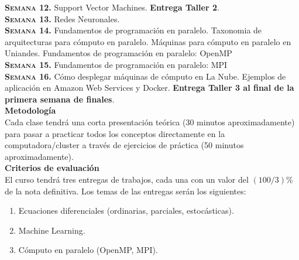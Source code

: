 \documentclass[letterpaper,10pt,onecolumn]{article}
\begin{document}
\noindent\textbf{\textsc{Semana 12.}}  
Support Vector Machines.
{\bf Entrega Taller 2}.
\\[-0.3cm]  

\noindent\textbf{\textsc{Semana 13.}} 
Redes Neuronales. 
\\[-0.3cm]  

\noindent\textbf{\textsc{Semana 14.}} 
Fundamentos de programaci\'on en paralelo. Taxonomia de arquitecturas
para c\'omputo en paralelo. M\'aquinas para c\'omputo en paralelo en
Uniandes. 
Fundamentos de programaci\'on en paralelo: OpenMP
\\[-0.3cm] 

\noindent\textbf{\textsc{Semana 15.}} 
Fundamentos de programaci\'on en paralelo: MPI
\\[-0.3cm] 

\noindent\textbf{\textsc{Semana 16.}} 
C\'omo desplegar m\'aquinas de c\'omputo en La Nube. Ejemplos de
aplicaci\'on en Amazon Web Services y Docker.  {\bf Entrega Taller 3 al final de la primera semana de finales}.
\\[-0.1cm]  


\noindent\textbf{\large {} \quad
  Metodolog\'ia}\\[-0.2cm] 


\noindent\normalsize Cada clase tendr\'a una corta presentaci\'on
te\'orica (30 minutos aproximadamente) para pasar a practicar todos
los conceptos directamente en la computadora/cluster a trav\'es de
ejercicios de pr\'actica (50 minutos aproximadamente). \\[0.1cm]


\noindent\textbf{\large {} \quad Criterios de
  evaluaci\'on}\\[-0.2cm] 


El curso tendr\'a tres entregas de trabajos, cada una con un valor
del $(100/3) \%$ de la nota definitiva. Los temas de las entregas ser\'an
los siguientes:
\begin{enumerate}
\item Ecuaciones diferenciales (ordinarias, parciales, estoc\'asticas).
\\[-0.6cm]
\item Machine Learning.
\\[-0.6cm]
\item C\'omputo en paralelo (OpenMP, MPI).
\\[-0.2cm]
\end{enumerate}
\end{document}
